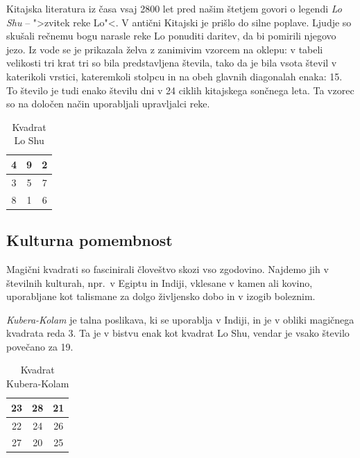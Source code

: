 \documentclass[a4paper,12pt]{article}
\theoremstyle{definition}
\theoremstyle{plain}
\begin{document}
Kitajska literatura iz časa vsaj 2800 let pred našim štetjem govori o legendi
\emph{Lo Shu} -- ">zvitek reke Lo"<. V antični Kitajski je prišlo do
silne poplave. Ljudje so skušali rečnemu bogu narasle reke Lo ponuditi daritev,
da bi pomirili njegovo jezo. Iz vode se je prikazala želva z zanimivim vzorcem
na oklepu: v tabeli velikosti tri krat tri so bila predstavljena števila, tako
da je bila vsota števil v katerikoli vrstici, kateremkoli stolpcu in na obeh
glavnih diagonalah enaka: 15. To število je tudi enako številu dni v 24 ciklih
kitajskega sončnega leta. Ta vzorec so na določen način uporabljali upravljalci
reke.

\begin{table}[!ht]
   \caption{Kvadrat Lo Shu}
   \label{table:loshu}
   \centering
   \large
   \begin{tabular}{|c|c|c|}
      \hline
      4 & 9 & 2 \\\hline
      3 & 5 & 7 \\\hline
      8 & 1 & 6 \\\hline   
   \end{tabular}
\end{table}


\subsection{Kulturna pomembnost}

Magični kvadrati so fascinirali človeštvo skozi vso zgodovino. Najdemo jih
v številnih kulturah, npr.\ v Egiptu in Indiji, vklesane v kamen ali
kovino, uporabljane kot talismane za dolgo življensko dobo in v
izogib boleznim.

\emph{Kubera-Kolam} je talna poslikava, ki se uporablja v Indiji, in je v
obliki magičnega kvadrata reda 3. Ta je v bistvu enak kot kvadrat
Lo Shu, vendar je vsako število povečano za 19.

\begin{table}[!ht]
   \caption{Kvadrat Kubera-Kolam}
   \label{table:kubera}
   \centering
   \large
   \begin{tabular}{|c|c|c|}
      \hline
      23 & 28 & 21 \\\hline
      22 & 24 & 26 \\\hline
      27 & 20 & 25 \\\hline   
   \end{tabular}
\end{table}
\end{document}
